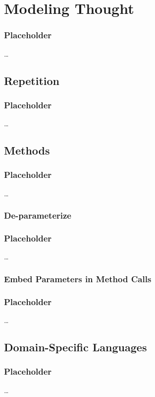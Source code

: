 \documentclass[slidestop,compress,mathserif,notes]{beamer}
\begin{document}
\section{Modeling Thought} %
\label{sec:modeling_thought}

\begin{frame}
	\frametitle{Placeholder}
	\ldots
\end{frame}

\subsection{Repetition} %
\label{sub:repetition}

\begin{frame}
	\frametitle{Placeholder}
	\ldots
\end{frame}



\subsection{Methods} %
\label{sub:methods}

\begin{frame}
	\frametitle{Placeholder}
	\ldots
\end{frame}

\subsubsection{De-parameterize}

\begin{frame}
	\frametitle{Placeholder}
	\ldots
\end{frame}


\subsubsection{Embed Parameters in Method Calls}

\begin{frame}
	\frametitle{Placeholder}
	\ldots
\end{frame}


\subsection{Domain-Specific Languages} %
\label{sub:domain_specific_languages}
\begin{frame}
	\frametitle{Placeholder}
	\ldots
\end{frame}
\end{document}
